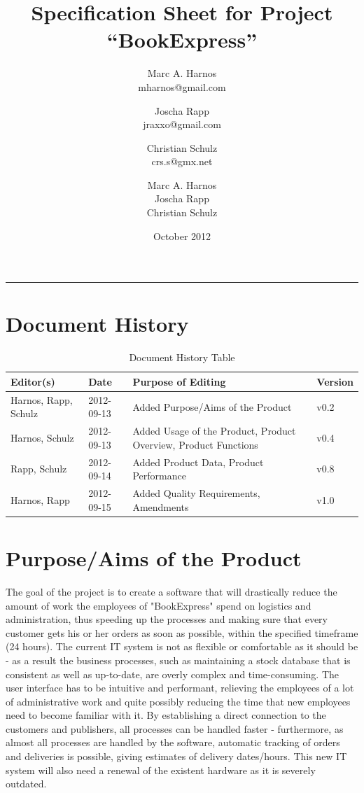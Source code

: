 \documentclass[11pt,a4paper,oneside,svgnames]{report}
\title{Specification Sheet for Project ``BookExpress''}
\author{Marc A. Harnos\\ {mharnos@gmail.com} \and Joscha Rapp\\ {jraxxo@gmail.com} \and Christian Schulz\\ {crs.s@gmx.net}}
\author{Marc A. Harnos\\ Joscha Rapp\\ Christian Schulz}
\date{October 2012}
\makeatletter
\renewcommand{\maketitle}{\begin{titlepage}%
    \let\footnotesize\small
    \let\footnoterule\relax
    \parindent \z@
    \reset@font
    \null\vfil
    \begin{flushleft}
      \huge \@title
    \end{flushleft}
    \par
    \hrule height 4pt
    \par
    \begin{flushright}
      \LARGE \@author \par
    \end{flushright}
    \vskip 60\p@
    \vfil\null
  \end{titlepage}%
  \setcounter{footnote}{0}%
}
\makeatother
\begin{document}
\maketitle
\clearpage
\tableofcontents
\clearpage

\chapter*{Document History}

\begin{table}[H]
\centering
\begin{tabular}{|p{3.8cm}|p{2cm}|p{5.5cm}|p{1.2cm}|}
\hline 
Editor(s) & Date & Purpose of Editing & Version \\ 
\hline 
Harnos, Rapp, Schulz & 2012-09-13 & Added Purpose/Aims of the Product & v0.2 \\ 
\hline
Harnos, Schulz & 2012-09-13 & Added Usage of the Product, Product Overview, Product Functions & v0.4 \\ 
\hline
Rapp, Schulz & 2012-09-14 & Added Product Data, Product Performance & v0.8 \\ 
\hline 
Harnos, Rapp & 2012-09-15 & Added Quality Requirements, Amendments & v1.0 \\ 
\hline 
\end{tabular}
\caption{Document History Table}
\label{tab:document-history}
\end{table}

\chapter{Purpose/Aims of the Product}
The goal of the project is to create a software that will drastically reduce the amount of work the employees of "BookExpress" spend on logistics and administration, thus speeding up the processes and making sure that every customer gets his or her orders as soon as possible, within the specified timeframe (24 hours). The current IT system is not as flexible or comfortable as it should be - as a result the business processes, such as maintaining a stock database that is consistent as well as up-to-date, are overly complex and time-consuming. The user interface has to be intuitive and performant, relieving the employees of a lot of administrative work and quite possibly reducing the time that new employees need to become familiar with it. By establishing a direct connection to the customers and publishers, all processes can be handled faster - furthermore, as almost all processes are handled by the software, automatic tracking of orders and deliveries is possible, giving estimates of delivery dates/hours. This new IT system will also need a renewal of the existent hardware as it is severely outdated. 
\\
\end{document}
